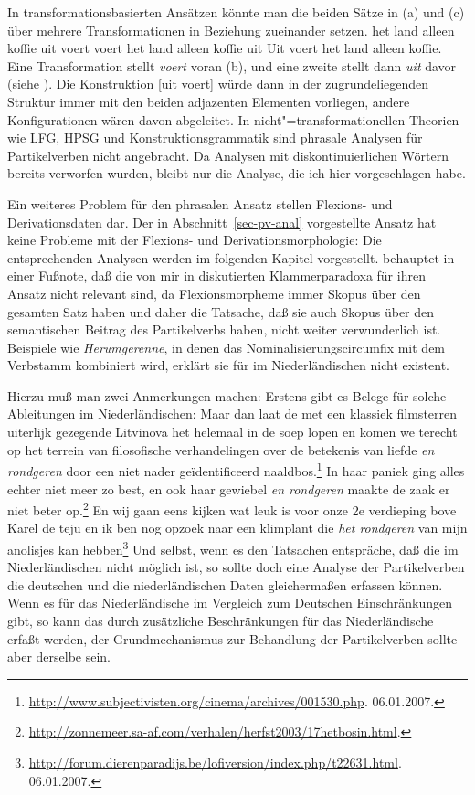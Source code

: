 %
In transformationsbasierten Ansätzen könnte man die beiden Sätze in (a) und (c)
über mehrere Transformationen in Beziehung zueinander setzen.
\eal
\ex het land alleen koffie uit voert
\ex voert het land alleen koffie uit
\ex Uit voert het land alleen koffie.
\zl
Eine Transformation stellt \emph{voert} voran (b), 
und eine zweite stellt dann \emph{uit} davor (siehe \zb {}).
Die Konstruktion [uit voert] würde dann in der zugrundeliegenden Struktur
immer mit den beiden adjazenten Elementen vorliegen, andere Konfigurationen wären 
davon abgeleitet. In nicht"=transformationellen
Theorien wie LFG, HPSG und Konstruktionsgrammatik sind phrasale Analysen für Partikelverben
nicht angebracht. Da Analysen mit diskontinuierlichen Wörtern bereits verworfen wurden,
bleibt nur die Analyse, die ich hier vorgeschlagen habe.
%

Ein weiteres Problem für den phrasalen Ansatz stellen Flexions- und Derivationsdaten
dar. Der in Abschnitt~\ref{sec-pv-anal} vorgestellte Ansatz hat keine Probleme mit der Flexions- und Derivationsmorphologie:
Die entsprechenden Analysen werden im folgenden Kapitel vorgestellt. \citet[]{Blom2005a}
behauptet in einer Fußnote, daß die von mir in  diskutierten Klammerparadoxa
für ihren Ansatz nicht relevant sind, da Flexionsmorpheme immer Skopus über den gesamten
Satz haben und daher die Tatsache, daß sie auch Skopus über den semantischen Beitrag des
Partikelverbs haben, nicht weiter verwunderlich ist. Beispiele wie \emph{Herumgerenne}, 
in denen das Nominalisierungscircumfix \gee mit dem Verbstamm kombiniert wird, erklärt
sie für im Niederländischen nicht existent.

Hierzu muß man zwei Anmerkungen machen: Erstens gibt es Belege für solche
Ableitungen im Niederländischen:
\eal
\ex Maar dan laat de met een klassiek filmsterren uiterlijk gezegende Litvinova het helemaal in de soep lopen en komen we terecht op het terrein van filosofische verhandelingen over de betekenis van liefde \emph{en rondgeren} 
door een niet nader geïdentificeerd naaldbos.\footnote{
\url{http://www.subjectivisten.org/cinema/archives/001530.php}. 06.01.2007.
}
\ex In haar paniek ging alles echter niet meer zo best, en ook haar gewiebel \emph{en rondgeren} maakte de zaak er niet beter op.\footnote{
\url{http://zonnemeer.sa-af.com/verhalen/herfst2003/17hetbosin.html}.
}
\ex En wij gaan eens kijken wat leuk is voor onze 2e verdieping bove Karel de teju en ik ben nog opzoek naar een klimplant die 
\emph{het rondgeren} van mijn anolisjes kan hebben\footnote{
\url{http://forum.dierenparadijs.be/lofiversion/index.php/t22631.html}. 06.01.2007.
}
\zl
Und selbst, wenn es den Tatsachen entspräche, daß die \geen im Niederländischen nicht
möglich ist, so sollte doch eine Analyse der Partikelverben die deutschen und die niederländischen
Daten gleichermaßen erfassen können. Wenn es für das Niederländische im Vergleich zum Deutschen
Einschränkungen gibt, so kann das durch zusätzliche Beschränkungen für das Niederländische
erfaßt werden, der Grundmechanismus zur Behandlung der Partikelverben sollte aber derselbe sein.

